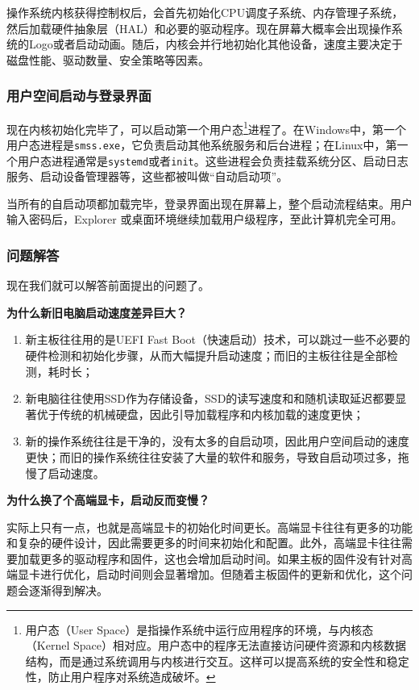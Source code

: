 操作系统内核获得控制权后，会首先初始化CPU调度子系统、内存管理子系统，然后加载硬件抽象层（HAL）和必要的驱动程序。现在屏幕大概率会出现操作系统的Logo或者启动动画。随后，内核会并行地初始化其他设备，速度主要决定于磁盘性能、驱动数量、安全策略等因素。

\subsubsection{用户空间启动与登录界面}

现在内核初始化完毕了，可以启动第一个用户态\footnote{用户态（User Space）是指操作系统中运行应用程序的环境，与内核态（Kernel Space）相对应。用户态中的程序无法直接访问硬件资源和内核数据结构，而是通过系统调用与内核进行交互。这样可以提高系统的安全性和稳定性，防止用户程序对系统造成破坏。}进程了。在Windows中，第一个用户态进程是\texttt{smss.exe}，它负责启动其他系统服务和后台进程；在Linux中，第一个用户态进程通常是\texttt{systemd}或者\texttt{init}。这些进程会负责挂载系统分区、启动日志服务、启动设备管理器等，这些都被叫做“自动启动项”。

当所有的自启动项都加载完毕，登录界面出现在屏幕上，整个启动流程结束。用户输入密码后，Explorer 或桌面环境继续加载用户级程序，至此计算机完全可用。

\subsubsection{问题解答}

现在我们就可以解答前面提出的问题了。

\textbf{为什么新旧电脑启动速度差异巨大？}

\begin{enumerate}
  \item 新主板往往用的是UEFI Fast Boot（快速启动）技术，可以跳过一些不必要的硬件检测和初始化步骤，从而大幅提升启动速度；而旧的主板往往是全部检测，耗时长；
  \item 新电脑往往使用SSD作为存储设备，SSD的读写速度和和随机读取延迟都要显著优于传统的机械硬盘，因此引导加载程序和内核加载的速度更快；
  \item 新的操作系统往往是干净的，没有太多的自启动项，因此用户空间启动的速度更快；而旧的操作系统往往安装了大量的软件和服务，导致自启动项过多，拖慢了启动速度。
\end{enumerate}

\textbf{为什么换了个高端显卡，启动反而变慢？}

实际上只有一点，也就是高端显卡的初始化时间更长。高端显卡往往有更多的功能和复杂的硬件设计，因此需要更多的时间来初始化和配置。此外，高端显卡往往需要加载更多的驱动程序和固件，这也会增加启动时间。如果主板的固件没有针对高端显卡进行优化，启动时间则会显著增加。但随着主板固件的更新和优化，这个问题会逐渐得到解决。

